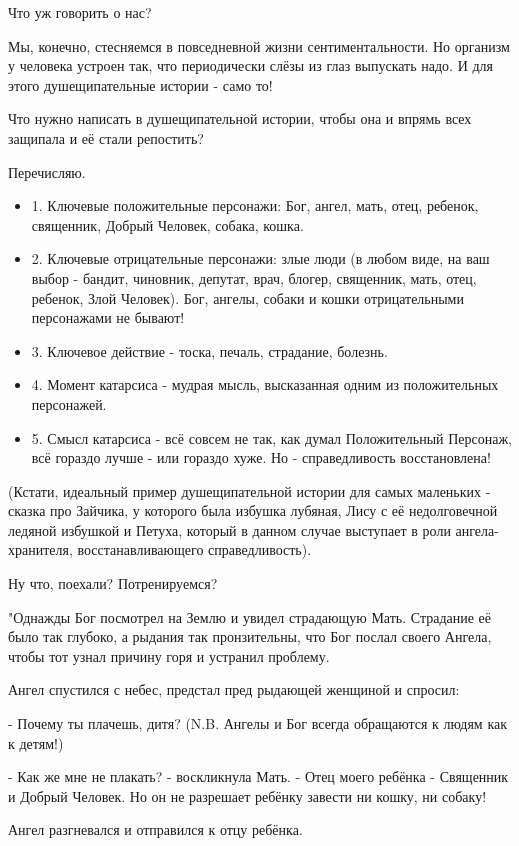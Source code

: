 Что уж говорить о нас?

Мы, конечно, стесняемся в повседневной жизни сентиментальности. Но организм у
человека устроен так, что периодически слёзы из глаз выпускать надо. И для
этого душещипательные истории - само то!

Что нужно написать в душещипательной истории, чтобы она и впрямь всех защипала и её стали репостить?

Перечисляю.

\begin{itemize}
  \item 1. Ключевые положительные персонажи: Бог, ангел, мать, отец, ребенок, священник, Добрый Человек, собака, кошка.
  \item 2. Ключевые отрицательные персонажи: злые люди (в любом виде, на ваш выбор - бандит, чиновник, депутат, врач, блогер, священник, мать, отец, ребенок, Злой Человек). Бог, ангелы, собаки и кошки отрицательными персонажами не бывают!
  \item 3. Ключевое действие - тоска, печаль, страдание, болезнь.
  \item 4. Момент катарсиса - мудрая мысль, высказанная одним из положительных персонажей.
  \item 5. Смысл катарсиса - всё совсем не так, как думал Положительный Персонаж, всё гораздо лучше - или гораздо хуже. Но - справедливость восстановлена!
\end{itemize}

(Кстати, идеальный пример душещипательной истории для самых маленьких - сказка
про Зайчика, у которого была избушка лубяная, Лису с её недолговечной ледяной
избушкой и Петуха, который в данном случае выступает в роли ангела-хранителя,
восстанавливающего справедливость).

Ну что, поехали? Потренируемся?

"Однажды Бог посмотрел на Землю и увидел страдающую Мать. Страдание её было так
глубоко, а рыдания так пронзительны, что Бог послал своего Ангела, чтобы тот
узнал причину горя и устранил проблему.

Ангел спустился с небес, предстал пред рыдающей женщиной и спросил:

- Почему ты плачешь, дитя?
(N.B. Ангелы и Бог всегда обращаются к людям как к детям!)

- Как же мне не плакать? - воскликнула Мать. - Отец моего ребёнка - Священник и
Добрый Человек. Но он не разрешает ребёнку завести ни кошку, ни собаку!

Ангел разгневался и отправился к отцу ребёнка.

